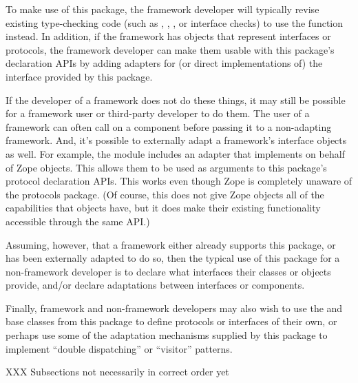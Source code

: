 To make use of this package, the framework developer will typically revise
existing type-checking code (such as ,
, , or interface checks) to use the
 function instead.  In addition, if the framework has objects
that represent interfaces or protocols, the framework developer can make
them usable with this package's declaration APIs by adding
adapters for (or direct implementations of) the 
interface provided by this package.

If the developer of a framework does not do these things, it may still be
possible for a framework user or third-party developer to do them.  The user
of a framework can often call  on a component before passing
it to a non-adapting framework.  And, it's possible to externally adapt a
framework's interface objects as well.  For example, the
 module includes an adapter that implements
 on behalf of Zope  objects.  This
allows them to be used as arguments to this package's protocol declaration
APIs.  This works even though Zope is completely unaware of the protocols
package.  (Of course, this does not give Zope  objects all
of the capabilities that  objects have, but it does make their
existing functionality accessible through the same API.)

Assuming, however, that a framework either already supports this package, or
has been externally adapted to do so, then the typical use of this package for
a non-framework developer is to declare what interfaces their classes or
objects provide, and/or declare adaptations between interfaces or components.

Finally, framework and non-framework developers may also wish to use the
 and  base classes from this package to
define protocols or interfaces of their own, or perhaps use some of the
adaptation mechanisms supplied by this package to implement ``double
dispatching'' or ``visitor'' patterns.


\begin{seealso}


\end{seealso}

XXX Subsections not necessarily in correct order yet

